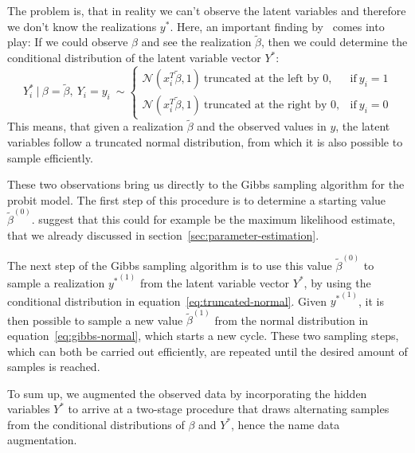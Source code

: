 The problem is, that in reality we can't observe the latent variables and
therefore we don't know the realizations $y^\ast$.
Here, an important finding by~\cite{gibbs-probit-albert-chib} comes
into play: If we could observe $\beta$ and see the realization
$\tilde\beta$, then we could determine the conditional distribution
of the latent variable vector $Y^\ast$:
\begin{equation}
    \label{eq:truncated-normal}
    Y_i^\ast\ |\ \beta = \tilde\beta,\ Y_i=y_i\ \sim
    \begin{cases}
        \mathcal{N}(x_i^T\tilde\beta, 1)\ \text{truncated at the left by 0},  & \text{if}\ y_i = 1 \\
        \mathcal{N}(x_i^T\tilde\beta, 1)\ \text{truncated at the right by 0}, & \text{if}\ y_i = 0
    \end{cases}
\end{equation}
This means, that given a realization $\tilde\beta$ and the observed
values in $y$, the latent variables
follow a truncated normal distribution, from which it is also
possible to sample efficiently.

These two observations bring us directly to the Gibbs sampling algorithm
for the probit model. The first step of this procedure is
to determine a starting value $\tilde\beta^{(0)}$.
\cite{gibbs-probit-albert-chib} suggest that this could for example
be the maximum likelihood estimate, that we already discussed in
section~\ref{sec:parameter-estimation}.

The next step of the Gibbs sampling algorithm is to use this value
$\tilde\beta^{(0)}$ to sample a realization ${y^\ast}^{(1)}$ from the latent
variable vector $Y^\ast$, by using the conditional distribution
in equation~\ref{eq:truncated-normal}. Given ${y^\ast}^{(1)}$,
it is then possible to sample a new value $\tilde\beta^{(1)}$ from
the normal distribution in equation~\ref{eq:gibbs-normal},
which starts a new cycle. These two sampling steps, which can
both be carried out efficiently, are repeated until
the desired amount of samples is reached.

To sum up, we augmented the observed data by incorporating the
hidden variables $Y^\ast$ to arrive at a two-stage procedure
that draws alternating samples from the conditional distributions
of $\beta$ and $Y^\ast$, hence the name data augmentation.
